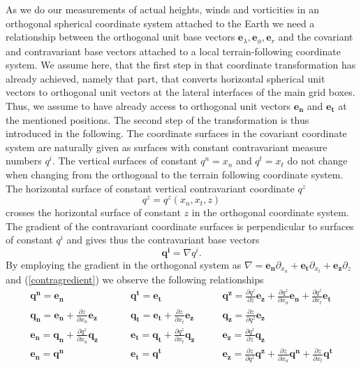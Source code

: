 As we do our measurements of actual heights, winds and vorticities in an orthogonal
spherical coordinate system attached to the Earth we need a relationship
between the orthogonal unit base vectors
$\mathbf{e}_{\lambda},\mathbf{e}_{\phi},\mathbf{e}_r$ and the covariant and
contravariant base vectors attached to a local terrain-following coordinate system.
We assume here, that the first step in that coordinate transformation has already
achieved, namely that part, that converts horizontal spherical unit vectors to orthogonal
unit vectors at the lateral interfaces of the main grid boxes. Thus, we assume to have
already access to orthogonal unit vectors $\mathbf{e_n}$ and $\mathbf{e_t}$ at
the mentioned positions. The second step of the transformation is thus introduced in the
following. The coordinate surfaces in the covariant coordinate system are naturally given
as surfaces with constant contravariant measure numbers $q^i$. The vertical surfaces of constant $q^n=x_n$ and $q^t=x_t$ do not change when changing from the
orthogonal to the terrain following coordinate system. The horizontal surface of
constant vertical contravariant coordinate $q^z$
\begin{displaymath}
 q^z=q^z(x_n,x_t,z)
\end{displaymath}
crosses the horizontal surface of constant $z$ in the orthogonal coordinate system.
The gradient of the contravariant coordinate surfaces is perpendicular to surfaces of constant $q^i$ and gives thus the contravariant base vectors
\begin{displaymath}
 \mathbf{q^i}=\nabla q^i.
\end{displaymath}
By employing the gradient in the orthogonal system as $\nabla=\mathbf{e_n}\partial_{x_n}+\mathbf{e_t}\partial_{x_t}+\mathbf{e_z}\partial_z$
and (\ref{contragredient}) we observe the following relationships
\begin{equation}
\begin{array}{lll}
\mathbf{q^n}=\mathbf{e_n}\qquad\qquad\qquad&
\mathbf{q^t}=\mathbf{e_t}\qquad&
\mathbf{q^z}=\frac{\partial q^z}{\partial z}\mathbf{e_z}+\frac{\partial q^z}{\partial x_n}\mathbf{e_n}
                +\frac{\partial q^z}{\partial x_t}\mathbf{e_t}      \\
\mathbf{q_n}=\mathbf{e_n}+\frac{\partial z}{\partial x_n}\mathbf{e_z}\qquad&
\mathbf{q_t}=\mathbf{e_t}+\frac{\partial z}{\partial x_t}\mathbf{e_z}\qquad&
\mathbf{q_z}=\frac{\partial z}{\partial q^z}\mathbf{e_z}\\
\mathbf{e_n}=\mathbf{q_n}+\frac{\partial q^z}{\partial x_n}\mathbf{q_z}\qquad&
\mathbf{e_t}=\mathbf{q_t}+\frac{\partial q^z}{\partial x_t}\mathbf{q_z}\qquad&
\mathbf{e_z}=\frac{\partial q^z}{\partial z}\mathbf{q_z}\\
\mathbf{e_n}=\mathbf{q^n}\qquad\qquad\qquad&
\mathbf{e_t}=\mathbf{q^t}\qquad&
\mathbf{e_z}=\frac{\partial z}{\partial q^z}\mathbf{q^z}+\frac{\partial z}{\partial x_n}\mathbf{q^n}
+\frac{\partial z}{\partial x_t}\mathbf{q^t}
\end{array}
\end{equation}
